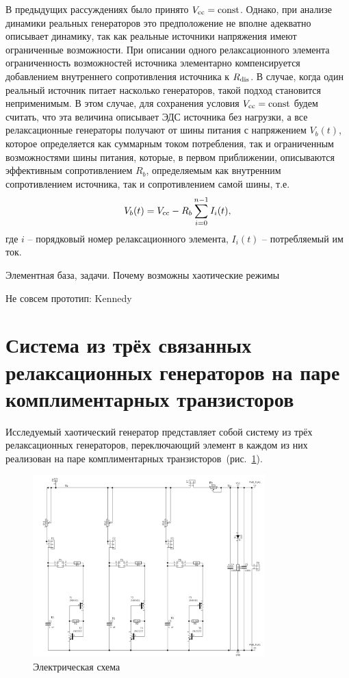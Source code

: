 В предыдущих рассуждениях было принято $V_\mathrm{cc} = \mathrm{const}$.
Однако, при анализе динамики реальных генераторов это предположение
не вполне адекватно описывает динамику, так как реальные
источники напряжения имеют ограниченные возможности.
При описании одного релаксационного элемента
ограниченность возможностей источника элементарно компенсируется
добавлением внутреннего сопротивления источника к $R_\mathrm{dis}$.
В случае, когда один реальный источник питает
насколько генераторов, такой подход становится неприменимым.
В этом случае, для сохранения условия  $V_\mathrm{cc} = \mathrm{const}$
будем считать, что эта величина описывает ЭДС источника
без нагрузки, а все релаксационные генераторы
получают от шины питания с напряжением $V_b(t)$,
которое определяется как суммарным током потребления,
так и ограниченным возможностями шины питания,
которые, в первом приближении, описываются
эффективным сопротивлением $R_b$, определяемым как внутренним сопротивлением
источника, так и сопротивлением самой шины, т.е.
%
\begin{equation}
  V_b(t) = V_\mathrm{cc} - R_b \sum\limits_{i=0}^{n-1} I_i(t),
  \label{atu:eq:V_b_relax}
\end{equation}
%
где $i$ -- порядковый номер релаксационного элемента,
$I_i(t)$ -- потребляемый им ток.



Элементная база, задачи. Почему возможны хаотические режимы



Не совсем прототип: Kennedy


\cite{mishenko_du_small_relax}

\section{Система из трёх связанных релаксационных генераторов на паре комплиментарных транзисторов}
\label{atu:sec:relax3d}


Исследуемый хаотический генератор представляет собой
систему из трёх релаксационных генераторов,
переключающий элемент в каждом из них реализован
на паре комплиментарных транзисторов~(рис.~\ref{atu:f:relax3d_schem}).

\begin{figure}[htb!]
  \centerline{\includegraphics[width=0.8\textwidth]{p/relax3d_schem.png} }
  \caption{Электрическая схема \RelaxBjtIi}
  \label{atu:f:relax3d_schem}
\end{figure}

